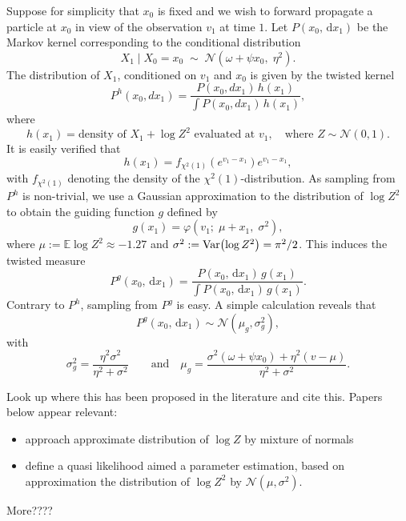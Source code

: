 \documentclass[11pt,reqno]{amsart}
\newcommand{\dd}{{\,\mathrm d}}
\renewcommand{\phi}{\varphi}
\renewcommand{\scr}[1]{{\mathcal #1}}
\newcommand{\EE}{\mathbb{E}}
\theoremstyle{definition}
\newcommand{\var}[1]{\ensuremath{{\rm Var}\!\left( #1 \right)}}
\newcommand{\dN}[2]{\mathcal{N}\left(#1, #2\right)}
\newcommand{\note}[1]{{\color{Sienna} #1}}
\begin{document}
Suppose for simplicity that  $x_0$ is fixed and we wish to forward propagate a particle at $x_0$ in view of the observation $v_1$ at time $1$.  Let 
$P(x_0, \dd x_1)$ be the Markov kernel corresponding to the conditional distribution
\[
  X_1 \mid X_0=x_0 \;\sim\; \mathcal{N}(\omega + \psi x_0,\; \eta^2).
\]
 The distribution of $X_1$, conditioned on $v_1$ and $x_0$ is given by the twisted kernel
 \[
  P^h(x_0, dx_1) = \frac{P(x_0, dx_1)\, h(x_1)}{\int P(x_0, dx_1)\, h(x_1)},\]
where 
\[
  h(x_1) = \text{density of } X_1 + \log Z^2 \text{ evaluated at } v_1,
  \quad \text{where } Z \sim \mathcal{N}(0,1).
 \]
 It is easily verified that 
\begin{equation}\label{eq:hx1}
  h(x_1) = f_{\chi^2(1)}\!\left(e^{v_1-x_1}\right) e^{v_1-x_1},
	\end{equation}
with $f_{\chi^2(1)}$ denoting the density of the $\chi^2(1)$-distribution. 
 As sampling from $P^h$ is non-trivial, we use a Gaussian approximation to the distribution of $\log Z^2$ to obtain the guiding function $g$ defined by 
\[
  g(x_1) = \phi(v_1;\; \mu + x_1,\; \sigma^2), \] where $\mu := \EE \log Z^2\approx -1.27$ and $\sigma^2 := \var{\log Z^2}= \pi^2/2$. 
This induces the twisted measure
\[   P^g(x_0, \dd x_1) = \frac{P(x_0, \dd x_1)\, g(x_1)}{\int P(x_0, \dd x_1)\, g(x_1)}.
\]
Contrary to $P^h$, sampling from $P^g$ is easy. A simple calculation reveals that 
\[ P^g(x_0, \dd x_1) \sim \dN{\mu_g}{\sigma_g^2}, \]
with
\[ \sigma_g^2=\frac{\eta^2\sigma^2}{\eta^2+\sigma^2} \qquad \text{and} \quad \mu_g = \frac{\sigma^2(\omega+\psi x_0)+\eta^2(v-\mu)}{\eta^2+\sigma^2}. 
\]


\note{Look up where this has been proposed in the literature and cite this. Papers below appear relevant:
\begin{itemize}
	\item \cite{kim1998stochastic} approach approximate distribution of $\log Z$ by mixture of normals
	\item \cite{harvey1994multivariate} define a quasi likelihood aimed a parameter estimation, based on approximation the distribution of $\log Z^2$ by $\scr{N}(\mu, \sigma^2)$. 
\end{itemize}
More????
}
\end{document}
